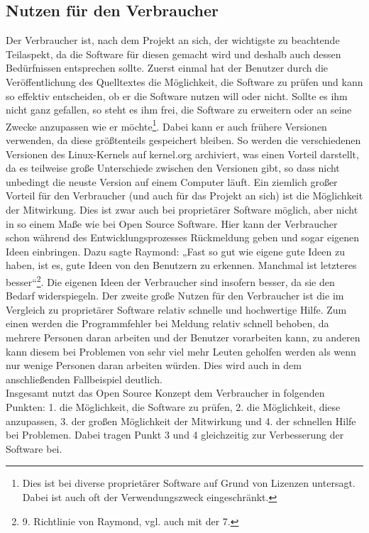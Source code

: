 \documentclass[a4paper,12pt]{article}
\begin{document}
\subsection{Nutzen für den Verbraucher}
Der Verbraucher ist, nach dem Projekt an sich, der wichtigste zu beachtende Teilaspekt, da die Software für diesen gemacht wird und deshalb auch dessen Bedürfnissen entsprechen sollte. Zuerst einmal hat der Benutzer durch die Veröffentlichung des Quelltextes die Möglichkeit, die Software zu prüfen und kann so effektiv entscheiden, ob er die Software nutzen will oder nicht. Sollte es ihm nicht ganz gefallen, so steht es ihm frei, die Software zu erweitern oder an seine Zwecke anzupassen wie er möchte\footnote{Dies ist bei diverse proprietärer Software auf Grund von Lizenzen untersagt. Dabei ist auch oft der Verwendungszweck eingeschränkt.}. Dabei kann er auch frühere Versionen verwenden, da diese größtenteils gespeichert bleiben. So werden die verschiedenen Versionen des Linux-Kernels auf kernel.org archiviert, was einen Vorteil darstellt, da es teilweise große Unterschiede zwischen den Versionen gibt, so dass nicht unbedingt die neuste Version auf einem Computer läuft. Ein ziemlich großer Vorteil für den Verbraucher (und auch für das Projekt an sich) ist die Möglichkeit der Mitwirkung. Dies ist zwar auch bei proprietärer Software möglich, aber nicht in so einem Maße wie bei Open Source Software. Hier kann der Verbraucher schon während des Entwicklungsprozesses Rückmeldung geben und sogar eigenen Ideen einbringen. Dazu sagte Raymond: „Fast so gut wie eigene gute Ideen zu haben, ist es, gute Ideen von den Benutzern zu erkennen. Manchmal ist letzteres besser“\footnote{9. Richtlinie von Raymond, vgl. auch mit der 7.}. Die eigenen Ideen der Verbraucher sind insofern besser, da sie den Bedarf widerspiegeln. Der zweite große Nutzen für den Verbraucher ist die im Vergleich zu proprietärer Software relativ schnelle und hochwertige Hilfe. Zum einen werden die Programmfehler bei Meldung relativ schnell behoben, da mehrere Personen daran arbeiten und der Benutzer vorarbeiten kann, zu anderen kann diesem bei Problemen von sehr viel mehr Leuten geholfen werden als wenn nur wenige Personen daran arbeiten würden. Dies wird auch in dem anschließenden Fallbeispiel deutlich.
\\Insgesamt nutzt das Open Source Konzept dem Verbraucher in folgenden Punkten: 1. die Möglichkeit, die Software zu prüfen, 2. die Möglichkeit, diese anzupassen, 3. der großen Möglichkeit der Mitwirkung und 4. der schnellen Hilfe bei Problemen. Dabei tragen Punkt 3 und 4 gleichzeitig zur Verbesserung der Software bei.
\end{document}
